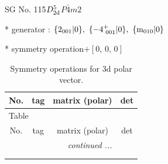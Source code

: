 \documentclass[fleqn,8pt]{jsarticle}
\begin{document}
\setcounter{MaxMatrixCols}{32}

\renewcommand{\tablename}{Table~}
\renewcommand{\figurename}{Figure~}
\begin{center}
\LARGE
SG No. 115\quad$D_{\rm 2d}^{5}$\quad$P\bar{4}m2$\quad[ tetragonal ]
\end{center}

* generator : $\{2{}_{001}|0\},\,\,\{-4^{+}_{\,\,001}|0\},\,\,\{{\rm m}_{010}|0\}$

* symmetry operation\quad$+\left[ 0,\, 0,\, 0 \right]$
\renewcommand{\arraystretch}{1.3}
\begin{longtable}{cccc}
\caption{Symmetry operations for 3d polar vector.}
 \\
 \hline \hline
No. & tag & matrix (polar) & det \\ \hline \endfirsthead

\multicolumn{3}{l}{\tablename\ \thetable{}} \\
 \hline \hline
No. & tag & matrix (polar) & det \\ \hline \endhead

 \hline \hline
\multicolumn{3}{r}{\footnotesize\it continued ...} \\ \endfoot

 \hline \hline
\multicolumn{3}{r}{} \\ \endlastfoot


\end{longtable}
\end{document}
